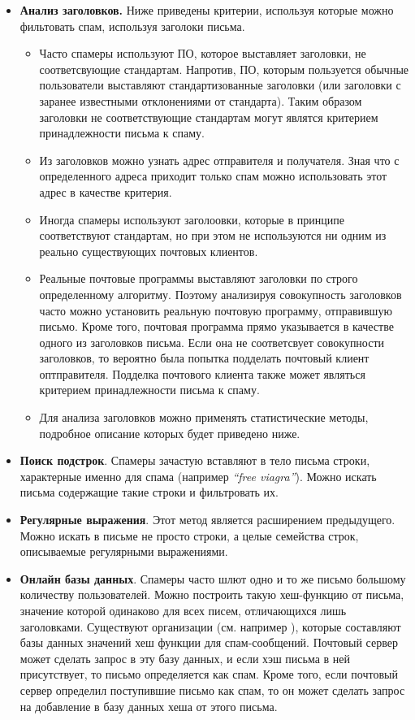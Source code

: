 \begin{itemize}
	\item \textbf{Анализ заголовков.} Ниже приведены критерии, используя которые можно фильтовать спам, используя заголоки письма.
	\begin{itemize}
		\item Часто спамеры используют ПО, которое выставляет заголовки, не соответсвующие стандартам. Напротив, ПО, которым пользуется обычные пользователи выставляют стандартизованные заголовки (или заголовки с заранее известными отклонениями от стандарта). Таким образом заголовки не соответствующие стандартам могут являтся критерием принадлежности письма к спаму. 
		\item Из заголовков можно узнать адрес отправителя и получателя. Зная что с определенного адреса приходит только спам можно использовать этот адрес в качестве критерия.
		\item Иногда спамеры используют заголоовки, которые в принципе соответствуют стандартам, но при этом не используются ни одним из реально существующих почтовых клиентов.
		\item Реальные почтовые программы выставляют заголовки по строго определенному алгоритму. Поэтому анализируя совокупность заголовков часто можно установить реальную почтовую программу, отправившую письмо. Кроме того, почтовая программа прямо указывается в качестве одного из заголовков письма. Если она не соответсвует совокупности заголовков, то вероятно была попытка подделать почтовый клиент оптправителя. Подделка почтового клиента также может являться критерием принадлежности письма к спаму.
		\item Для анализа заголовков можно применять статистические методы, подробное описание которых будет приведено ниже.
	\end{itemize}
	\item \textbf{Поиск подстрок}. Спамеры зачастую вставляют в тело письма строки, характерные именно для спама (например \textit{``free viagra''}). Можно искать письма содержащие такие строки и фильтровать их.
	\item \textbf{Регулярные выражения}. Этот метод является расширением предыдущего. Можно искать в письме не просто строки, а целые семейства строк, описываемые регулярными выражениями.
	\item \textbf{Онлайн базы данных}. Спамеры часто шлют одно и то же письмо большому количеству пользователей. Можно построить такую хеш-функцию от письма, значение которой одинаково для всех писем, отличающихся лишь заголовками. Существуют организации (см. например \cite{RAZOR}), которые составляют базы данных значений хеш функции для спам-сообщений. Почтовый сервер может сделать запрос в эту базу данных, и если хэш письма в ней присутствует, то письмо определяется как спам. Кроме того, если почтовый сервер определил поступившие письмо как спам, то он может сделать запрос на добавление в базу данных хеша от этого письма.

\end{itemize}
